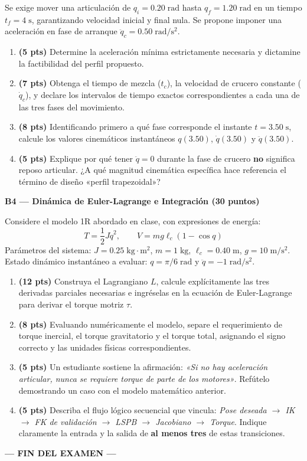 \documentclass[11pt, a4paper]{article}
\begin{document}
Se exige mover una articulación de $q_i = 0.20\;\mathrm{rad}$ hasta $q_f = 1.20\;\mathrm{rad}$ en un tiempo $t_f = 4\;\mathrm{s}$, garantizando velocidad inicial y final nula. Se propone imponer una aceleración en fase de arranque $\ddot{q}_c = 0.50\;\mathrm{rad/s^2}$.

\begin{enumerate}
    \item \textbf{(5 pts)} Determine la aceleración mínima estrictamente necesaria y dictamine la factibilidad del perfil propuesto.
    \item \textbf{(7 pts)} Obtenga el tiempo de mezcla ($t_c$), la velocidad de crucero constante ($\dot{q}_c$), y declare los intervalos de tiempo exactos correspondientes a cada una de las tres fases del movimiento.
    \item \textbf{(8 pts)} Identificando primero a qué fase corresponde el instante $t = 3.50\;\mathrm{s}$, calcule los valores cinemáticos instantáneos $q(3.50)$, $\dot{q}(3.50)$ y $\ddot{q}(3.50)$.
    \item \textbf{(5 pts)} Explique por qué tener $\ddot{q} = 0$ durante la fase de crucero \textbf{no} significa reposo articular. ¿A qué magnitud cinemática específica hace referencia el término de diseño «perfil trapezoidal»?
\end{enumerate}

\vspace{0.3cm}
\noindent\textbf{\large B4 — Dinámica de Euler-Lagrange e Integración (30 puntos)}

Considere el modelo 1R abordado en clase, con expresiones de energía:
\begin{equation*}
    T = \frac{1}{2}J\dot{q}^2, \qquad V = mg\ell_c(1 - \cos q)
\end{equation*}
Parámetros del sistema: $J = 0.25\;\mathrm{kg\cdot m^2}$, $m = 1\;\mathrm{kg}$, $\ell_c = 0.40\;\mathrm{m}$, $g = 10\;\mathrm{m/s^2}$. \\
Estado dinámico instantáneo a evaluar: $q = \pi/6\;\mathrm{rad}$ y $\ddot{q} = -1\;\mathrm{rad/s^2}$.

\begin{enumerate}
    \item \textbf{(12 pts)} Construya el Lagrangiano $L$, calcule explícitamente las tres derivadas parciales necesarias e ingréselas en la ecuación de Euler-Lagrange para derivar el torque motriz $\tau$.
    \item \textbf{(8 pts)} Evaluando numéricamente el modelo, separe el requerimiento de torque inercial, el torque gravitatorio y el torque total, asignando el signo correcto y las unidades físicas correspondientes.
    \item \textbf{(5 pts)} Un estudiante sostiene la afirmación: \textit{«Si no hay aceleración articular, nunca se requiere torque de parte de los motores»}. Refútelo demostrando un caso con el modelo matemático anterior.
    \item \textbf{(5 pts)} Describa el flujo lógico secuencial que vincula: \textit{Pose deseada $\to$ IK $\to$ FK de validación $\to$ LSPB $\to$ Jacobiano $\to$ Torque}. Indique claramente la entrada y la salida de \textbf{al menos tres} de estas transiciones.
\end{enumerate}

\begin{center}
    \textbf{--- FIN DEL EXAMEN ---}
\end{center}
\end{document}
